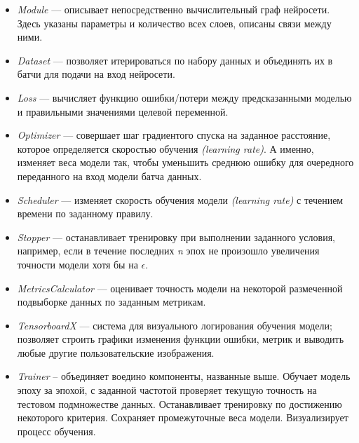 \begin{itemize}

	\item
	\textit{Module} --- описывает непосредственно вычислительный граф нейросети. 
	Здесь указаны параметры и количество всех слоев, описаны связи между ними.
	
	\item
	\textit{Dataset} --- позволяет итерироваться по набору данных и объединять их в 
	батчи для подачи на вход нейросети.
	
	\item
	\textit{Loss} --- вычисляет функцию ошибки/потери между предсказанными 
	моделью  и правильными значениями целевой переменной.
	
	\item
	\textit{Optimizer} --- совершает шаг градиентого спуска на заданное расстояние,
	которое определяется скоростью обучения \textit{(learning rate)}. А именно,
	изменяет веса модели так, чтобы уменьшить среднюю ошибку для очередного
	переданного на вход модели батча данных.
	
	\item
	\textit{Scheduler} --- изменяет скорость обучения модели \textit{(learning rate)}
	с течением времени по заданному правилу.
	
	\item
	\textit{Stopper} --- останавливает тренировку при выполнении заданного 
	условия, например, если в течение последних \textit{n} эпох не произошло
	увеличения точности модели хотя бы на $\epsilon$.
	
	\item
	\textit{MetricsCalculator} --- оценивает точность модели на некоторой размеченной
	подвыборке данных по заданным метрикам.
	
	\item
	\textit{TensorboardX}  --- система для визуального логирования обучения
	модели; позволяет строить графики изменения функции ошибки, метрик и
	выводить любые другие пользовательские изображения.
	
	\item
	\textit{Trainer} -- объединяет воедино компоненты, названные выше. Обучает
	модель эпоху за эпохой, с заданной частотой проверяет текущую точность
	на тестовом подмножестве данных. Останавливает тренировку по
	достижению некоторого критерия. Сохраняет промежуточные
	веса модели. Визуализирует процесс обучения.
 
 \end{itemize}


